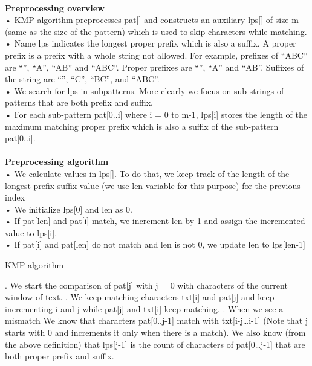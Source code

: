 \documentclass[11pt,a4paper]{article}
\begin{document}
\\
\textbf{Preprocessing overview}
\\
• KMP algorithm preprocesses pat[] and constructs an auxiliary lps[] of size m (same as the size of the pattern) which is used to skip characters while matching.
\\
• Name lps indicates the longest proper prefix which is also a suffix. A proper prefix is a prefix with a whole string not allowed. For example, prefixes of “ABC” are “”, “A”, “AB” and “ABC”. Proper prefixes are “”, “A” and “AB”. Suffixes of the string are “”, “C”, “BC”, and “ABC”.
\\
• We search for lps in subpatterns. More clearly we focus on sub-strings of patterns that are both prefix and suffix.
\\
• For each sub-pattern pat[0..i] where i = 0 to m-1, lps[i] stores the length of the maximum matching proper prefix which is also a suffix of the sub-pattern pat[0..i].
\\
\\
\textbf{Preprocessing algorithm}
\\
• We calculate values in lps[]. To do that, we keep track of the length of the longest prefix suffix value (we use len variable for this purpose) for the previous index
\\
• We initialize lps[0] and len as 0.
\\
• If pat[len] and pat[i] match, we increment len by 1 and assign the incremented value to lps[i].
\\
• If pat[i] and pat[len] do not match and len is not 0, we update len to lps[len-1]

\begin{algorithm}[H]
\caption*{KMP algorithm}
\label{spapsuedocode}
\begin{algorithmic}
. We start the comparison of pat[j] with j = 0 with characters of the current window of text.
. We keep matching characters txt[i] and pat[j] and keep incrementing i and j while pat[j] and txt[i] keep matching.
. When we see a mismatch
\STATE \hspace{1cm}  We know that characters pat[0..j-1] match with txt[i-j…i-1] (Note that j starts with 0 and increments it only when there is a match).
\STATE \hspace{1cm} We also know (from the above definition) that lps[j-1] is the count of characters of pat[0…j-1] that are both proper prefix and suffix.
\end{algorithmic}
\end{algorithm}
\end{document}
